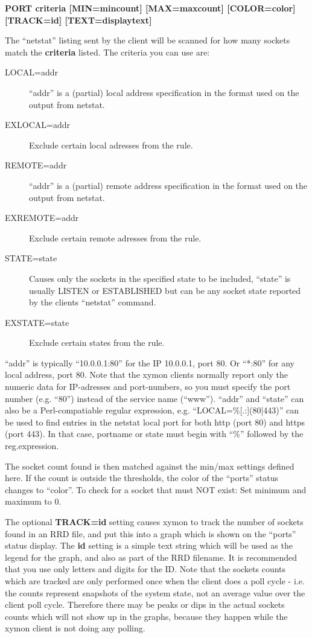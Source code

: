  \textbf{PORT criteria [MIN=mincount] [MAX=maxcount] [COLOR=color] [TRACK=id] [TEXT=displaytext]}



  The ``netstat'' listing sent by the client will be scanned for how many sockets match the \textbf{criteria}
 listed. The criteria you can use are: \begin{description}
\item[LOCAL=addr] ``addr'' is a (partial) local address specification in the format used on the output from netstat. 
\item[EXLOCAL=addr] Exclude certain local adresses from the rule. 
\item[REMOTE=addr] ``addr'' is a (partial) remote address specification in the format used on the output from netstat. 
\item[EXREMOTE=addr] Exclude certain remote adresses from the rule. 
\item[STATE=state] Causes only the sockets in the specified state to be included, ``state'' is usually LISTEN or ESTABLISHED but can be any socket state reported by the clients ``netstat'' command. 
\item[EXSTATE=state] Exclude certain states from the rule. 

\end{description}



  ``addr'' is typically ``10.0.0.1:80'' for the IP 10.0.0.1, port 80. Or ``*:80'' for any local address, port 80. Note that the xymon clients normally report only the numeric data for IP-adresses and port-numbers, so you must specify the port number (e.g. ``80'') instead of the service name (``www'').  
 ``addr'' and ``state'' can also be a Perl-compatiable regular expression, e.g. ``LOCAL=\%[.:](80|443)'' can be used to find entries in the netstat local port for both http (port 80) and https (port 443). In that case, portname or state must begin with ``\%'' followed by the reg.expression. 


  The socket count found is then matched against the min/max settings defined here. If the count is outside the thresholds, the color of the ``ports'' status changes to ``color''. To check for a socket that must NOT exist: Set minimum and maximum to 0. 


  The optional \textbf{TRACK=id}
 setting causes xymon to track the number of sockets found in an RRD file, and put this into a graph which is shown on the ``ports'' status display. The \textbf{id}
 setting is a simple text string which will be used as the legend for the graph, and also as part of the RRD filename. It is recommended that you use only letters and digits for the ID.  
 Note that the sockets counts which are tracked are only performed once when the client does a poll cycle - i.e. the counts represent snapshots of the system state, not an average value over the client poll cycle. Therefore there may be peaks or dips in the actual sockets counts which will not show up in the graphs, because they happen while the xymon client is not doing any polling. 


